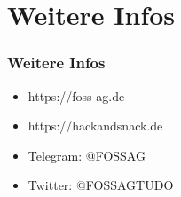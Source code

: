 \documentclass[12pt,utf8]{beamer}
\begin{document}
\section{Weitere Infos}
	\begin{frame}
		\frametitle{Weitere Infos}
		\begin{itemize}
			\item https://foss-ag.de
			\item https://hackandsnack.de
			\item Telegram: @FOSSAG
			\item Twitter: @FOSSAGTUDO	
		\end{itemize}
	\end{frame}
\end{document}

